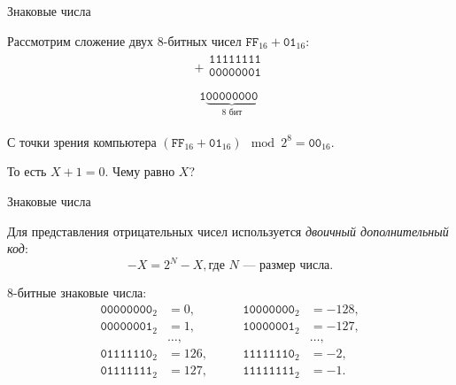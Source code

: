 \documentclass{beamer}
\newcommand{\pcnum}[1]{\ensuremath{\mathtt{#1}}}
\newcommand{\bin}[1]{\pcnum{#1}_2}
\newcommand{\hex}[1]{\pcnum{#1}_{16}}
\begin{document}
\begin{frame}{Знаковые числа}



  Рассмотрим сложение двух 8-битных чисел
  $\hex{FF} + \hex{01}$:
  \[
    \begin{array}{r}
    +
      \begin{array}{r}
        \pcnum{11111111} \\
        \pcnum{00000001} \\
      \end{array} \\
      \hline
      \begin{array}{r}
        \pcnum{1}\underbrace{\pcnum{00000000}}_{8 \text{ бит}}
      \end{array}
    \end{array}
  \]

  С точки зрения компьютера $(\hex{FF} + \hex{01}) \mod 2^8 = \hex{00}$.

  То есть $X + 1 = 0$. Чему равно $X$?

\end{frame}

\begin{frame}{Знаковые числа}

  Для представления отрицательных чисел используется \emph{двоичный
  дополнительный код}:
  \[ -X = 2^N - X, \text{где $N$~--- размер числа.}\]

  8-битные знаковые числа:
  \begin{align*}
    \bin{0000 0000} &= 0,    &\qquad \bin{1000 0000} &= -128, \\
    \bin{0000 0001} &= 1,    &\qquad \bin{1000 0001} &= -127, \\
                    &\ldots, &\qquad                 &\ldots, \\
    \bin{0111 1110} &= 126,  &\qquad \bin{1111 1110} &= -2,   \\
    \bin{0111 1111} &= 127,  &\qquad \bin{1111 1111} &= -1.
  \end{align*}


\end{frame}
\end{document}
